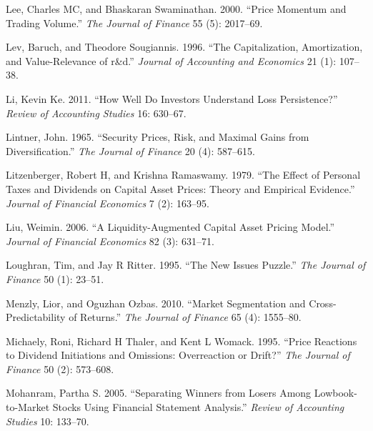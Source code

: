 \documentclass[
  letterpaper,
  DIV=11,
  numbers=noendperiod]{scrreprt}
\newlength{\cslhangindent}
\newlength{\cslentryspacingunit} %
\newenvironment{CSLReferences}[2] %
 {%
  \setlength{\parindent}{0pt}
  \ifodd #1
  \let\oldpar\par
  \def\par{\hangindent=\cslhangindent\oldpar}
  \fi
  \setlength{\parskip}{#2\cslentryspacingunit}
 }%
 {}
\begin{document}
\begin{CSLReferences}{1}{0}
\leavevmode{}%
Lee, Charles MC, and Bhaskaran Swaminathan. 2000. {``Price Momentum and
Trading Volume.''} \emph{The Journal of Finance} 55 (5): 2017--69.

\leavevmode{}%
Lev, Baruch, and Theodore Sougiannis. 1996. {``The Capitalization,
Amortization, and Value-Relevance of r\&d.''} \emph{Journal of
Accounting and Economics} 21 (1): 107--38.

\leavevmode{}%
Li, Kevin Ke. 2011. {``How Well Do Investors Understand Loss
Persistence?''} \emph{Review of Accounting Studies} 16: 630--67.

\leavevmode{}%
Lintner, John. 1965. {``Security Prices, Risk, and Maximal Gains from
Diversification.''} \emph{The Journal of Finance} 20 (4): 587--615.

\leavevmode{}%
Litzenberger, Robert H, and Krishna Ramaswamy. 1979. {``The Effect of
Personal Taxes and Dividends on Capital Asset Prices: Theory and
Empirical Evidence.''} \emph{Journal of Financial Economics} 7 (2):
163--95.

\leavevmode{}%
Liu, Weimin. 2006. {``A Liquidity-Augmented Capital Asset Pricing
Model.''} \emph{Journal of Financial Economics} 82 (3): 631--71.

\leavevmode{}%
Loughran, Tim, and Jay R Ritter. 1995. {``The New Issues Puzzle.''}
\emph{The Journal of Finance} 50 (1): 23--51.

\leavevmode{}%
Menzly, Lior, and Oguzhan Ozbas. 2010. {``Market Segmentation and
Cross-Predictability of Returns.''} \emph{The Journal of Finance} 65
(4): 1555--80.

\leavevmode{}%
Michaely, Roni, Richard H Thaler, and Kent L Womack. 1995. {``Price
Reactions to Dividend Initiations and Omissions: Overreaction or
Drift?''} \emph{The Journal of Finance} 50 (2): 573--608.

\leavevmode{}%
Mohanram, Partha S. 2005. {``Separating Winners from Losers Among
Lowbook-to-Market Stocks Using Financial Statement Analysis.''}
\emph{Review of Accounting Studies} 10: 133--70.


\end{CSLReferences}
\end{document}
